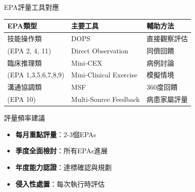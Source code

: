 \documentclass[aspectratio=169]{beamer}
\begin{document}
\begin{frame}{EPA評量工具對應}
\begin{table}
\centering
\footnotesize
\begin{tabular}{|l|l|l|}
\hline
\rowcolor{emergency_blue!20}
\textbf{EPA類型} & \textbf{主要工具} & \textbf{輔助方法} \\
\hline
技能操作類 & DOPS & 直接觀察評估 \\
(EPA 2, 4, \textcolor{emergency_red}{11}) & \scriptsize Direct Observation & 同儕回饋 \\
\hline
臨床推理類 & Mini-CEX & 病例討論 \\
(EPA 1,3,5,6,7,8,9) & \scriptsize Mini-Clinical Exercise & 模擬情境 \\
\hline
溝通協調類 & MSF & 360度回饋 \\
(EPA 10) & \scriptsize Multi-Source Feedback & 病患家屬評量 \\
\hline
\end{tabular}
\end{table}

\vspace{0.5cm}

\begin{block}{評量頻率建議}
\begin{itemize}
\item \textbf{每月重點評量}：2-3個EPAs
\item \textbf{季度全面檢討}：所有EPAs進展
\item \textbf{年度能力認證}：達標確認與規劃
\item \textcolor{emergency_red}{\textbf{侵入性處置}}：每次執行時評估
\end{itemize}
\end{block}
\end{frame}
\end{document}
